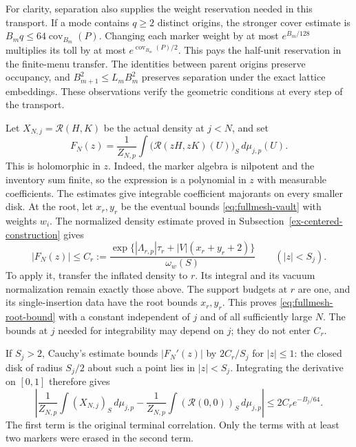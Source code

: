 For clarity, separation also supplies the weight reservation needed
in this transport. If a mode contains $q\ge2$ distinct origins, the
stronger cover estimate is $B_m q\le64\operatorname{cov}_{B_m}(P)$.
Changing each marker weight by at most $e^{B_m/128}$ multiplies its
toll by at most $e^{\operatorname{cov}_{B_m}(P)/2}$. This pays the
half-unit reservation in the finite-menu transfer. The identities
between parent origins preserve occupancy, and
$B_{m+1}^2\le L_mB_m^2$ preserves separation under the exact
lattice embeddings. These observations verify the geometric
conditions at every step of the transport.

Let $X_{N,j}=\mathcal R(H,K)$ be the actual density at $j<N$, and
set
\[
 F_N(z)=\frac1{Z_{N,p}}
   \int\bigl(\mathcal R(zH,zK)(U)\bigr)_S\,d\mu_{j,p}(U).
\]
This is holomorphic in $z$. Indeed, the marker algebra is nilpotent
and the inventory sum finite, so the expression is a polynomial in
$z$ with measurable coefficients. The estimates give integrable
coefficient majorants on every smaller disk. At the root, let
$x_r,y_r$ be the eventual bounds \eqref{eq:fullmesh-vault} with
weights $w_i$. The normalized density estimate proved in
Subsection~\ref{ex-centered-construction} gives
\begin{equation}\label{eq:fullmesh-root-bound}
 |F_N(z)|\le C_r:=
 \frac{\exp\{ |\Lambda_{r,p}|\tau_r+|V|(x_r+y_r+2)\}}
 {\omega_w(S)}\qquad(|z|<S_j).
\end{equation}
To apply it, transfer the inflated density to $r$. Its integral and
its vacuum normalization remain exactly those above. The support
budgets at $r$ are one, and its single-insertion data have the root
bounds $x_r,y_r$. This proves \eqref{eq:fullmesh-root-bound} with
a constant independent of $j$ and of all sufficiently large $N$.
The bounds at $j$ needed for integrability may depend on $j$; they
do not enter $C_r$.

If $S_j>2$, Cauchy's estimate bounds $|F_N'(z)|$ by $2C_r/S_j$
for $|z|\le1$: the closed disk of radius $S_j/2$ about such a
point lies in $|z|<S_j$. Integrating the derivative on $[0,1]$
therefore gives
\begin{equation}\label{eq:fullmesh-omission}
 \left|\frac1{Z_{N,p}}\int(X_{N,j})_S\,d\mu_{j,p}
       -\frac1{Z_{N,p}}\int(\mathcal R(0,0))_S\,d\mu_{j,p}\right|
 \le2C_r e^{-B_j/64}.
\end{equation}
The first term is the original terminal correlation. Only the terms
with at least two markers were erased in the second term.

